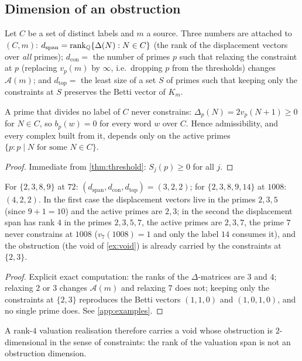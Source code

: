 \subsection{Dimension of an obstruction}
Let $C$ be a set of distinct labels and $m$ a source. Three numbers are attached to $(C,m)$: $d_{\mathrm{span}}=\operatorname{rank}_{\mathbb Q}\{\Delta(N):N\in C\}$ (the rank of the displacement vectors over \emph{all} primes); $d_{\mathrm{con}}=$ the number of primes $p$ such that relaxing the constraint at $p$ (replacing $v_p(m)$ by $\infty$, i.e.\ dropping $p$ from the thresholds) changes $\mathcal A(m)$; and $d_{\mathrm{top}}=$ the least size of a set $S$ of primes such that keeping only the constraints at $S$ preserves the Betti vector of $K_m$.
\begin{theorem}\label{thm:passive}
A prime that divides no label of $C$ never constrains: $\Delta_p(N)=2v_p(N+1)\ge0$ for $N\in C$, so $b_p(w)=0$ for every word $w$ over $C$. Hence admissibility, and every complex built from it, depends only on the active primes $\{p:p\mid N\text{ for some }N\in C\}$.
\end{theorem}
\begin{proof}
Immediate from \cref{thm:threshold}: $S_j(p)\ge0$ for all $j$.
\end{proof}
\begin{proposition}\label{prop:dims}
For $\{2,3,8,9\}$ at $72$: $(d_{\mathrm{span}},d_{\mathrm{con}},d_{\mathrm{top}})=(3,2,2)$; for $\{2,3,8,9,14\}$ at $1008$: $(4,2,2)$. In the first case the displacement vectors live in the primes $2,3,5$ (since $9+1=10$) and the active primes are $2,3$; in the second the displacement span has rank $4$ in the primes $2,3,5,7$, the active primes are $2,3,7$, the prime $7$ never constrains at $1008$ ($v_7(1008)=1$ and only the label $14$ consumes it), and the obstruction (the void of \cref{ex:void}) is already carried by the constraints at $\{2,3\}$.
\end{proposition}
\begin{proof}
Explicit exact computation: the ranks of the $\Delta$-matrices are $3$ and $4$; relaxing $2$ or $3$ changes $\mathcal A(m)$ and relaxing $7$ does not; keeping only the constraints at $\{2,3\}$ reproduces the Betti vectors $(1,1,0)$ and $(1,0,1,0)$, and no single prime does. See \cref{app:examples}.
\end{proof}
A rank-$4$ valuation realisation therefore carries a void whose obstruction is $2$-dimensional in the sense of constraints: the rank of the valuation span is not an obstruction dimension.
